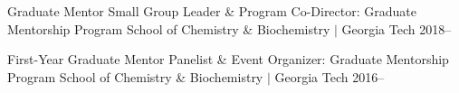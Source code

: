 



\begin{cvservices}
  \cvservice
    {Graduate Mentor} %
    {Small Group Leader \& Program Co-Director: Graduate Mentorship Program} %
    {School of Chemistry \& Biochemistry $\vert$ Georgia Tech} %
    {2018--} %

  \cvservice
    {First-Year Graduate Mentor} %
    {Panelist \& Event Organizer: Graduate Mentorship Program} %
    {School of Chemistry \& Biochemistry $\vert$ Georgia Tech} %
    {2016--} %

\end{cvservices}

